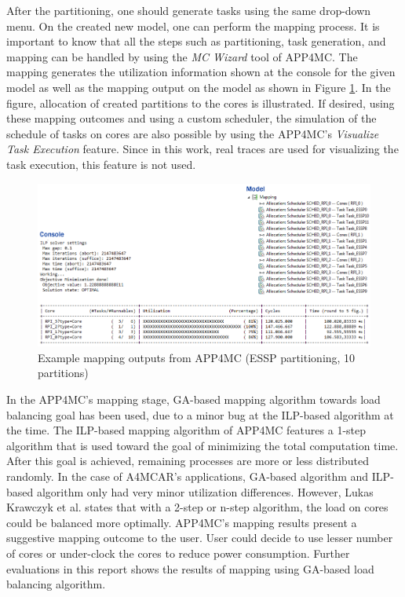 After the partitioning, one should generate tasks using the same drop-down menu. On the created new model, one can perform the mapping process. It is important to know that all the steps such as partitioning, task generation, and mapping can be handled by using the \textit{MC Wizard} tool of APP4MC. The mapping generates the utilization information shown at the console for the given model as well as the mapping output on the model as shown in Figure \ref{fig:mappings}. In the figure, allocation of created partitions to the cores is illustrated. If desired, using these mapping outcomes and using a custom scheduler, the simulation of the schedule of tasks on cores are also possible by using the APP4MC's \textit{Visualize Task Execution} feature. Since in this work, real traces are used for visualizing the task execution, this feature is not used.

\begin{figure}[!ht]
	\centering
	\captionsetup{justification=centering}
	\includegraphics[width=\textwidth]{content/images/mappings.png}
	\caption{Example mapping outputs from APP4MC (ESSP partitioning, 10 partitions)}
	\label{fig:mappings}
\end{figure}

In the APP4MC's mapping stage, GA-based mapping algorithm towards load balancing goal has been used, due to a minor bug at the ILP-based algorithm at the time. The ILP-based mapping algorithm of APP4MC features a 1-step algorithm that is used toward the goal of minimizing the total computation time. After this goal is achieved, remaining processes are more or less distributed randomly. In the case of A4MCAR's applications, GA-based algorithm and ILP-based algorithm only had very minor utilization differences. However, Lukas Krawczyk et al. \cite{mappingbook} states that with a 2-step or n-step algorithm, the load on cores could be balanced more optimally. APP4MC's mapping results present a suggestive mapping outcome to the user. User could decide to use lesser number of cores or under-clock the cores to reduce power consumption. Further evaluations in this report shows the results of mapping using GA-based load balancing algorithm.

